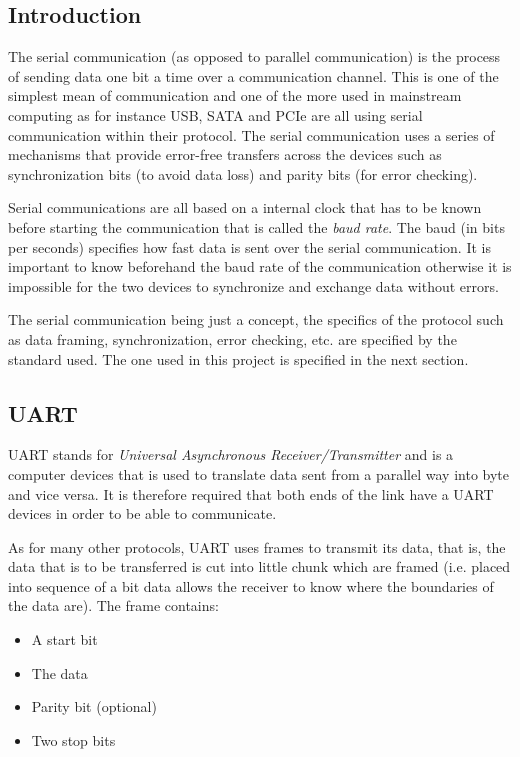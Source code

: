 \subsection{Introduction}
The serial communication (as opposed to parallel communication) is the process of sending data one bit a time over a communication channel. This is one of the simplest mean of communication and one of the more used in mainstream computing as for instance USB, SATA and PCIe are all using serial communication within their protocol. The serial communication uses a series of mechanisms that provide error-free transfers across the devices such as synchronization bits (to avoid data loss) and parity bits (for error checking).

Serial communications are all based on a internal clock that has to be known before starting the communication that is called the \emph{baud rate}. The baud (in bits per seconds) specifies how fast data is sent over the serial communication. It is important to know beforehand the baud rate of the communication otherwise it is impossible for the two devices to synchronize and exchange data without errors.

The serial communication being just a concept, the specifics of the protocol such as data framing, synchronization, error checking, etc. are specified by the standard used. The one used in this project is specified in the next section.


\subsection{UART}
UART stands for \textit{Universal Asynchronous Receiver/Transmitter}\cite{uart} and is a computer devices that is used to translate data sent from a parallel way into byte and vice versa. It is therefore required that both ends of the link have a UART devices in order to be able to communicate.

As for many other protocols, UART uses frames to transmit its data, that is, the data that is to be transferred is cut into little chunk which are framed (i.e. placed into sequence of a bit data allows the receiver to know where the boundaries of the data are).
The frame contains:
\begin{itemize}
\item A start bit
\item The data
\item Parity bit (optional)
\item Two stop bits
\end{itemize}

